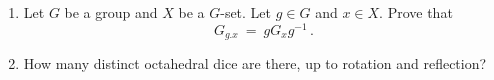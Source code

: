 \documentclass[12pt]{article}
\begin{document}
\begin{enumerate}
\item
  Let $G$ be a group and $X$ be a $G$-set.
  Let $g\in G$ and $x\in X$.
  Prove that
  \[
      G_{g.x}\ =\ g G_x g^{-1}\,.
  \]


\item
  How many distinct octahedral dice are there, up to rotation and reflection?
  



\end{enumerate}
\end{document}
